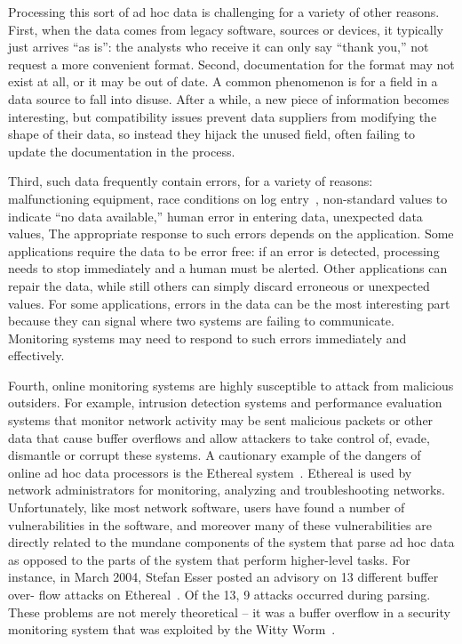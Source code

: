 \documentclass[10pt]{article}
\begin{document}
Processing this sort of 
ad hoc data is challenging for a variety of other reasons. 
First, when the data comes from legacy software, sources or devices, it 
typically just arrives ``as is'': the analysts
who receive it can only say ``thank you,'' not request a more
convenient format.  Second, documentation for the format may not exist
at all, or it may be out of date.  A common phenomenon is for a field
in a data source to fall into disuse.  After a while, a new piece of
information becomes interesting, but compatibility issues prevent data
suppliers from modifying the shape of their data, so instead they
hijack the unused field, often failing to update the documentation in
the process.

Third, such data frequently contain errors, for a variety of reasons:
malfunctioning equipment, race conditions on log entry~\cite{wpp},
non-standard values to indicate ``no data available,'' human error in
entering data, unexpected data values, \etc{} The appropriate response
to such errors depends on the application.  Some applications require
the data to be error free: if an error is detected, processing needs
to stop immediately and a human must be alerted.  Other applications
can repair the data, while still others can simply discard erroneous
or unexpected values.  For some applications, errors in the data can
be the most interesting part because they can signal where two systems
are failing to communicate.  Monitoring systems may need to respond to such
errors immediately and effectively.

Fourth, online monitoring systems
are highly susceptible to attack from malicious outsiders.
For example, intrusion detection systems
and performance evaluation systems that monitor network activity 
may be sent malicious packets or other data that cause buffer overflows
and allow attackers to take control of, evade, dismantle or corrupt these
systems.  A cautionary example of the dangers of online ad hoc data
processors is the Ethereal system~\cite{ethereal}. Ethereal is used by network administrators for monitoring, analyzing
and troubleshooting networks. Unfortunately, like most network software, users have found a number of
vulnerabilities in the software, and moreover many of these vulnerabilities are directly related to the mundane
components of the system that parse ad hoc data as opposed to the parts of the system that perform
higher-level tasks. For instance, in March 2004, Stefan Esser posted an advisory on 13 different buffer over-
flow attacks on Ethereal~\cite{etherealvulnerabilities}. Of the 13, 9 attacks occurred during parsing. These problems are not merely theoretical -- it was
a buffer overflow in a security monitoring system that was exploited by the
Witty Worm~\cite{witty}.
\end{document}
